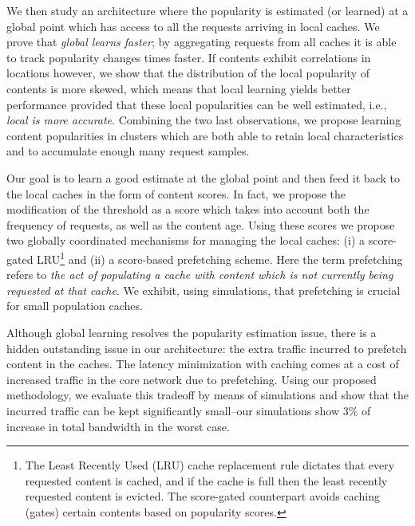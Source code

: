 \documentclass[10pt, conference, letterpaper]{IEEEtran}
\newcommand{\spyros}[1]{{#1}}
\begin{document}
We then study an architecture where the popularity is estimated (or learned) at a global point which has access to all the requests arriving in  local caches. 
We prove that \emph{global learns faster}; by aggregating requests from all  caches it is able to \spyros {track popularity changes}  times faster.
If contents exhibit correlations in locations however, we show that the distribution of the local popularity of contents is more skewed, which means that local learning yields better performance  provided that these local popularities can be well estimated, i.e., \emph{local is more accurate}. \spyros {Combining the two last observations, we propose learning content popularities in clusters which are both able to retain local characteristics and to accumulate enough many request samples.}


Our goal is to learn a good estimate at the global point and then feed it back to the local caches in the form of content scores. In fact, we propose the modification of the threshold  as a score which  
takes into account both the frequency of requests, as well as the content age. 
Using these scores we propose two globally coordinated mechanisms for \spyros {managing} the local caches: (i) a score-gated LRU\footnote{The Least Recently Used (LRU) cache replacement rule dictates that every requested content is cached, and if the cache is full then the least recently requested content is evicted. The score-gated counterpart avoids caching (gates) certain contents based on popularity scores. } and (ii) a score-based prefetching scheme.  
Here the term prefetching refers to \emph{the act of populating a cache with content which is not currently being requested at that cache}. 
We exhibit, using simulations, that prefetching is crucial for small population caches. 

Although global learning resolves the popularity estimation issue, there is a hidden outstanding issue in our architecture: the extra traffic incurred to prefetch content in the caches.
The latency minimization with caching comes at a cost of increased traffic in the core network due to prefetching. Using our proposed methodology, we evaluate this tradeoff by means of simulations and show that the incurred traffic can be kept significantly small--our simulations show 3\% of increase in total bandwidth in the worst case.
\end{document}
